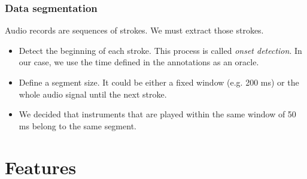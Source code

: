\documentclass{beamer}
\begin{document}
    \begin{frame}
        \frametitle{Data segmentation}
        Audio records are sequences of strokes. We must extract those strokes.
        \begin{itemize}
            \item Detect the beginning of each stroke. This process is called \emph{onset detection}. In our case, we use the time defined in the annotations as an oracle.
            \item Define a segment size. It could be either a fixed window (e.g. 200 ms) or the whole audio signal until the next stroke.
            \item We decided that instruments that are played within the same window of 50 ms belong to the same segment.
        \end{itemize}
    \end{frame}
    \section{Features}
\end{document}
